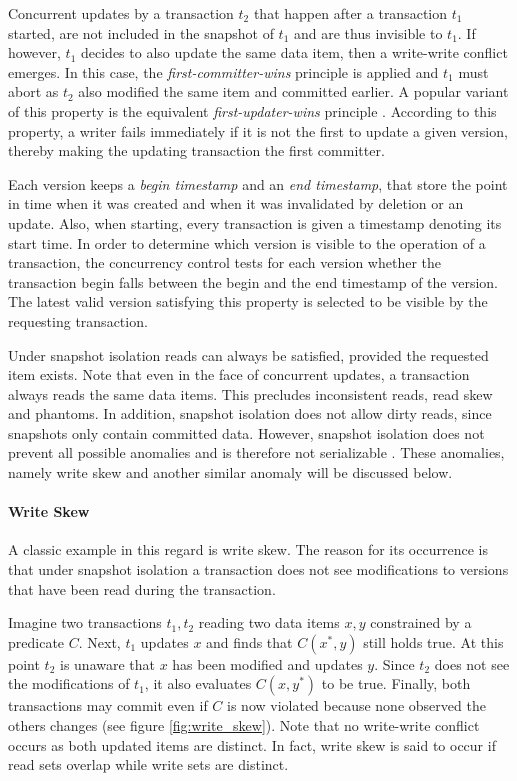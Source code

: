 Concurrent updates by a transaction $t_2$ that happen after a transaction $t_1$
started, are not included in the snapshot of $t_1$ and are thus invisible to
$t_1$. If however, $t_1$ decides to also update the same data item, then a
write-write conflict emerges. In this case, the \textit{first-committer-wins}
principle is applied and $t_1$ must abort as $t_2$ also modified the same item
and committed earlier. A popular variant of this property is the equivalent
\textit{first-updater-wins} principle \cite{fekete2004read, larson2011high}.
According to this property, a writer fails immediately if it is not the first to
update a given version, thereby making the updating transaction the first
committer.

Each version keeps a \textit{begin timestamp} and an \textit{end timestamp},
that store the point in time when it was created and when it was invalidated by
deletion or an update. Also, when starting, every transaction is given a
timestamp denoting its start time. In order to determine which version is
visible to the operation of a transaction, the concurrency control tests for
each version whether the transaction begin falls between the begin and the end
timestamp of the version. The latest valid version satisfying this property is
selected to be visible by the requesting transaction.

Under snapshot isolation reads can always be satisfied, provided the requested
item exists. Note that even in the face of concurrent updates, a transaction
always reads the same data items. This precludes inconsistent reads, read skew
and phantoms. In addition, snapshot isolation does not allow dirty reads, since
snapshots only contain committed data. However, snapshot isolation does not
prevent all possible anomalies and is therefore not serializable
\cite{berenson1995critique}. These anomalies, namely write skew and another
similar anomaly will be discussed below.

\paragraph{Write Skew}

A classic example in this regard is write skew. The reason for its occurrence is
that under snapshot isolation a transaction does not see modifications to
versions that have been read during the transaction.

Imagine two transactions $t_1, t_2$ reading two data items $x, y$ constrained by
a predicate $C$. Next, $t_1$ updates $x$ and finds that $C(x^{*}, y)$ still
holds true. At this point $t_2$ is unaware that $x$ has been modified and
updates $y$. Since $t_2$ does not see the modifications of $t_1$, it also
evaluates $C(x, y^{*})$ to be true. Finally, both transactions may commit even
if $C$ is now violated because none observed the others changes (see figure
\ref{fig:write_skew}). Note that no write-write conflict occurs as both updated
items are distinct. In fact, write skew is said to occur if read sets overlap
while write sets are distinct.

